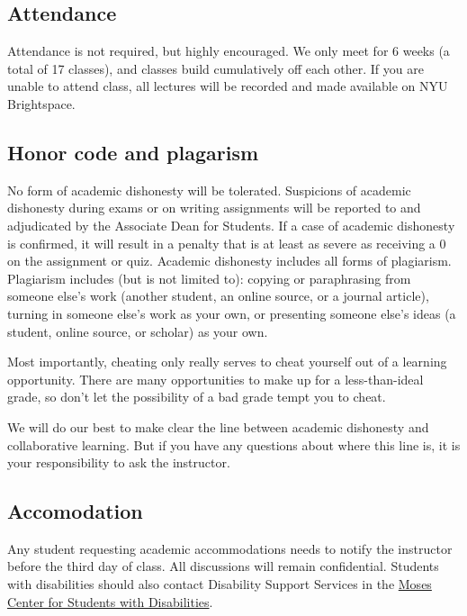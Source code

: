 \documentclass[
]{book}
\begin{document}
\hypertarget{attendance}{%
\subsection{Attendance}\label{attendance}}

Attendance is not required, but highly encouraged. We only meet for 6 weeks (a total of 17 classes), and classes build cumulatively off each other. If you are unable to attend class, all lectures will be recorded and made available on NYU Brightspace.

\hypertarget{honor-code-and-plagarism}{%
\subsection{Honor code and plagarism}\label{honor-code-and-plagarism}}

No form of academic dishonesty will be tolerated. Suspicions of academic dishonesty during exams or on writing assignments will be reported to and adjudicated by the Associate Dean for Students. If a case of academic dishonesty is confirmed, it will result in a penalty that is at least as severe as receiving a 0 on the assignment or quiz. Academic dishonesty includes all forms of plagiarism. Plagiarism includes (but is not limited to): copying or paraphrasing from someone else's work (another student, an online source, or a journal article), turning in someone else's work as your own, or presenting someone else's ideas (a student, online source, or scholar) as your own.

Most importantly, cheating only really serves to cheat yourself out of a learning opportunity. There are many opportunities to make up for a less-than-ideal grade, so don't let the possibility of a bad grade tempt you to cheat.

We will do our best to make clear the line between academic dishonesty and collaborative learning. But if you have any questions about where this line is, it is your responsibility to ask the instructor.

\hypertarget{accomodation}{%
\subsection{Accomodation}\label{accomodation}}

Any student requesting academic accommodations needs to notify the instructor before the third day of class. All discussions will remain confidential. Students with disabilities should also contact Disability Support Services in the \href{https://www.nyu.edu/students/communities-and-groups/student-accessibility.html}{Moses Center for Students with Disabilities}.
\end{document}
